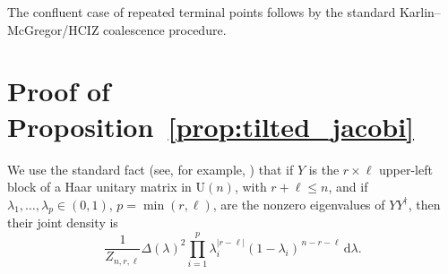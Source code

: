 \documentclass[11pt,a4paper]{article}
\theoremstyle{definition}\newtheorem{definition}[theorem]{Definition}
\theoremstyle{remark}\newtheorem{remark}[theorem]{Remark}
\numberwithin{equation}{section}
\newcommand{\dd}{\mathrm{d}}
\newcommand{\UU}{\mathrm{U}(n)}
\begin{document}
The confluent case of repeated terminal points follows by the standard Karlin--McGregor/HCIZ coalescence procedure.


 
\section{Proof of Proposition~\ref{prop:tilted_jacobi}}
\label{app:tilted_jacobi}

We use the standard fact (see, for example, \cite{EdelmanSutton2008}) that if
$Y$ is the $r\times \ell$ upper-left block of a Haar unitary matrix in $\UU$,
with $r+\ell\le n$, and if $\lambda_1,\dots,\lambda_p\in(0,1)$,
$p=\min(r,\ell)$, are the nonzero eigenvalues of $YY^\dagger$, then their joint
density is
\begin{equation}\label{eq:appendix_jacobi_block_law}
\frac{1}{Z_{n,r,\ell}}
\Delta(\lambda)^2
\prod_{i=1}^{p}\lambda_i^{|r-\ell|}(1-\lambda_i)^{\,n-r-\ell}\,\dd \lambda.
\end{equation}
\end{document}
